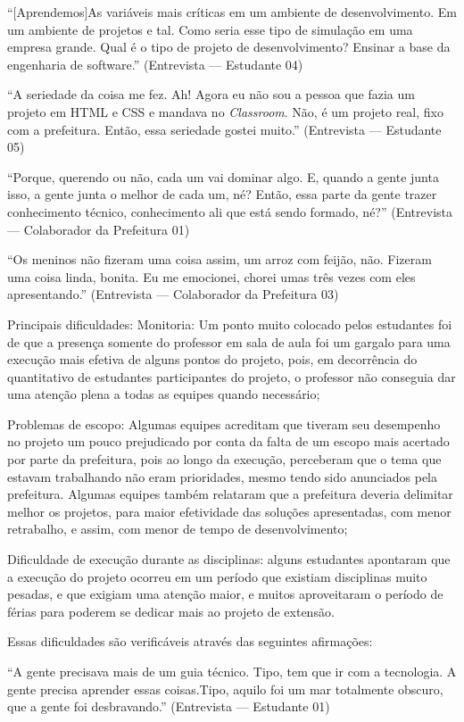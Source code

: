 \begin{enumerate}
“[Aprendemos]As variáveis mais críticas em um ambiente de desenvolvimento. Em um ambiente de projetos e tal. Como seria esse tipo de simulação em uma empresa grande. Qual é o tipo de projeto de desenvolvimento? Ensinar a base da engenharia de software.”
(Entrevista — Estudante 04)

“A seriedade da coisa me fez. Ah! Agora eu não sou a pessoa que fazia um projeto em HTML e CSS e mandava no \textit{Classroom}. Não, é um projeto real, fixo com a prefeitura. Então, essa seriedade gostei muito.”
(Entrevista — Estudante 05)

“Porque, querendo ou não, cada um vai dominar algo. E, quando a gente junta isso, a gente junta o melhor de cada um, né? Então, essa parte da gente trazer conhecimento técnico, conhecimento ali que está sendo formado, né?”
(Entrevista — Colaborador da Prefeitura 01)

“Os meninos não fizeram uma coisa assim, um arroz com feijão, não. Fizeram uma coisa linda, bonita. Eu me emocionei, chorei umas três vezes com eles apresentando.”
(Entrevista — Colaborador da Prefeitura 03)

Principais dificuldades:
Monitoria: Um ponto muito colocado pelos estudantes foi de que a presença somente do professor em sala de aula foi um gargalo para uma execução mais efetiva de alguns pontos do projeto, pois, em decorrência do quantitativo de estudantes participantes do projeto, o professor não conseguia dar uma atenção plena a todas as equipes quando necessário;

Problemas de escopo: Algumas equipes acreditam que tiveram seu desempenho no projeto um pouco prejudicado por conta da falta de um escopo mais acertado por parte da prefeitura, pois ao longo da execução, perceberam que o tema que estavam trabalhando não eram prioridades, mesmo tendo sido anunciados pela prefeitura. Algumas equipes também relataram que a prefeitura deveria delimitar melhor os projetos, para maior efetividade das soluções apresentadas, com menor retrabalho, e assim, com menor de tempo de desenvolvimento;

Dificuldade de execução durante as disciplinas: alguns estudantes apontaram que a execução do projeto ocorreu em um período que existiam disciplinas muito pesadas, e que exigiam uma atenção maior, e muitos aproveitaram o período de férias para poderem se dedicar mais ao projeto de extensão.

Essas dificuldades são verificáveis através das seguintes afirmações:

“A gente precisava mais de um guia técnico. Tipo, tem que ir com a tecnologia. A gente precisa aprender essas coisas.Tipo, aquilo foi um mar totalmente obscuro, que a gente foi desbravando.”
(Entrevista — Estudante 01)


\end{enumerate}
